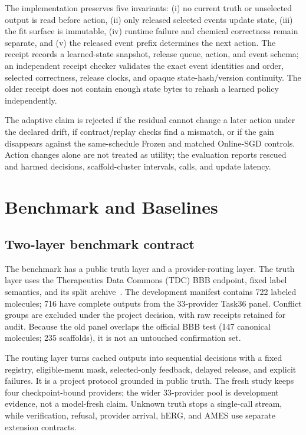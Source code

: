\documentclass[sigconf,anonymous]{aamas}
\begin{document}
The implementation preserves five invariants: (i) no current truth or unselected output is read before action, (ii) only released selected events update state, (iii) the fit surface is immutable, (iv) runtime failure and chemical correctness remain separate, and (v) the released event prefix determines the next action. The receipt records a learned-state snapshot, release queue, action, and event schema; an independent receipt checker validates the exact event identities and order, selected correctness, release clocks, and opaque state-hash/version continuity. The older receipt does not contain enough state bytes to rehash a learned policy independently.

The adaptive claim is rejected if the residual cannot change a later action under the declared drift, if contract/replay checks find a mismatch, or if the gain disappears against the same-schedule Frozen and matched Online-SGD controls. Action changes alone are not treated as utility; the evaluation reports rescued and harmed decisions, scaffold-cluster intervals, calls, and update latency.

\section{Benchmark and Baselines}
\subsection{Two-layer benchmark contract}
The benchmark has a public truth layer and a provider-routing layer. The truth layer uses the Therapeutics Data Commons (TDC) BBB endpoint, fixed label semantics, and its split archive~\cite{huang2021tdc}. The development manifest contains 722 labeled molecules; 716 have complete outputs from the 33-provider Task36 panel. Conflict groups are excluded under the project decision, with raw receipts retained for audit. Because the old panel overlaps the official BBB test (147 canonical molecules; 235 scaffolds), it is not an untouched confirmation set.

The routing layer turns cached outputs into sequential decisions with a fixed registry, eligible-menu mask, selected-only feedback, delayed release, and explicit failures. It is a project protocol grounded in public truth. The fresh study keeps four checkpoint-bound providers; the wider 33-provider pool is development evidence, not a model-fresh claim. Unknown truth stops a single-call stream, while verification, refusal, provider arrival, hERG, and AMES use separate extension contracts.
\end{document}
